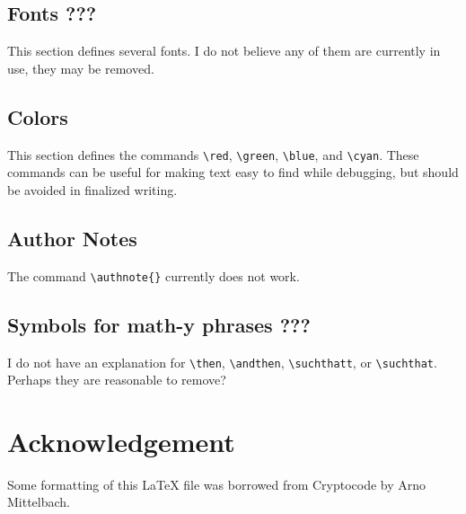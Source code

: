 \documentclass[11pt,twoside]{report}
\begin{document}
\subsection{Fonts ???}
This section defines several fonts.
I do not believe any of them are currently in use, they may be removed.


\subsection{Colors}
This section defines the commands \lstinline$\red$, \lstinline$\green$, \lstinline$\blue$, and \lstinline$\cyan$.
These commands can be useful for making text easy to find while debugging, but should be avoided in finalized writing.

\subsection{Author Notes}
The command \lstinline$\authnote{}$ currently does not work.

\subsection{Symbols for math-y phrases ???}
I do not have an explanation for \lstinline$\then$, \lstinline$\andthen$, \lstinline$\suchthatt$, or \lstinline$\suchthat$.
Perhaps they are reasonable to remove?


\section{Acknowledgement}
Some formatting of this LaTeX file was borrowed from Cryptocode by Arno Mittelbach.
\end{document}
